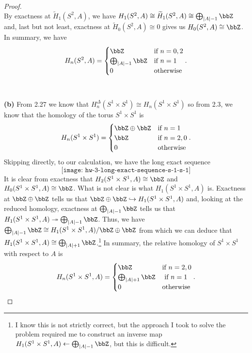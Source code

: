 \begin{proof}
\[\]
By exactness at $\widetilde H_1(S^2,A)$, we have $H_1(S^2,A)\cong\widetilde
H_1(S^2,A)\cong\bigoplus_{|A|-1}\bbZ$ and, last but not least, exactness at
$\widetilde H_0(S^2,A)\cong 0$ gives us $H_0(S^2,A)\cong\bbZ$. In summary,
we have
\begin{equation}
  \label{eq:homology-of-s-2-a}
H_n(S^2,A)=
\begin{cases}
\bbZ&\text{if $n=0,2$}\\
\bigoplus_{|A|-1}\bbZ&\text{if $n=1$}\\
0&\text{otherwise}
\end{cases}.
\end{equation}
\\\\
\textbf{(b)} From 2.27 we know that
$H_n^\Delta(S^1\times S^1)\cong H_n(S^1\times S^1)$ so from 2.3, we know
that the homology of the torus $S^1\times S^1$ is
\begin{equation}
\label{eq:homology-of-s-1-s-1}
H_n(S^1\times S^1)=
\begin{cases}
\bbZ\oplus\bbZ&\text{if $n=1$}\\
\bbZ&\text{if $n=2,0$}\\
0&\text{otherwise}
\end{cases}.
\end{equation}
Skipping directly, to our calculation, we have the long exact sequence
\begin{equation}
  \label{eq:long-exact-sequence-s-1-s-1}
\texttt{[image: hw-3-long-exact-sequence-s-1-s-1]}
\end{equation}
It is clear from exactness that $H_2(S^1\times S^1,A)\cong\bbZ$ and
$H_0(S^1\times S^1,A)\cong\bbZ$. What is not clear is what $H_1(S^1\times
S^1,A)$ is. Exactness at $\bbZ\oplus\bbZ$ tells us that
$\bbZ\oplus\bbZ\hookrightarrow H_1(S^1\times S^1,A)$ and, looking at the
reduced homology, exactness at $\bigoplus_{|A|-1}\bbZ$ tells us that
$H_1(S^1\times S^1,A)\twoheadrightarrow\bigoplus_{|A|-1}\bbZ$. Thus,
we have $\bigoplus_{|A|-1}\bbZ\cong H_1(S^1\times S^1,A)/\bbZ\oplus\bbZ$
from which we can deduce that $H_1(S^1\times
S^1,A)\cong\bigoplus_{|A|+1}\bbZ$.\footnote{I know this is not strictly
  correct, but the approach I took to solve the problem required me to
  construct an inverse map $H_1(S^1\times
  S^1,A)\leftarrow\bigoplus_{|A|-1}\bbZ$, but this is difficult.} In summary, the relative homology of
$S^1\times S^1$ with respect to $A$ is
\begin{equation}
  \label{eq:homology-of-s-1-s-1-a}
H_n(S^1\times S^1,A)=
\begin{cases}
\bbZ&\text{if $n=2,0$}\\
\bigoplus_{|A|+1}\bbZ&\text{ if $n=1$}\\
0&\text{otherwise}
\end{cases}.
\end{equation}
\qedhere
\end{proof}
\newpage

